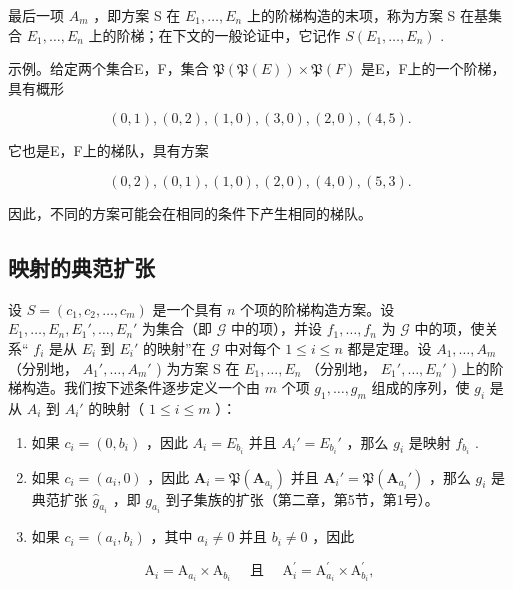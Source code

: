 最后一项 \(A_{m}\) ，即方案 S 在 \(E_{1}, \ldots, E_{n}\) 上的阶梯构造的末项，称为方案 S 在基集合 \(E_{1}, \ldots, E_{n}\) 上的阶梯；在下文的一般论证中，它记作 \(S(E_{1}, \ldots, E_{n})\) .

示例。给定两个集合E，F，集合 \(\mathfrak{P}(\mathfrak{P}(E)) \times \mathfrak{P}(F)\) 是E，F上的一个阶梯，具有概形

\[
(0, 1), (0, 2), (1, 0), (3, 0), (2, 0), (4, 5).
\]

它也是E，F上的梯队，具有方案

\[
(0, 2), (0, 1), (1, 0), (2, 0), (4, 0), (5, 3).
\]

因此，不同的方案可能会在相同的条件下产生相同的梯队。

\subsection{映射的典范扩张}

设 \(S = (c_1, c_2, \ldots, c_m)\) 是一个具有 \(n\) 个项的阶梯构造方案。设 \(E_1, \ldots, E_n, E_1', \ldots, E_n'\) 为集合（即 \(\mathcal{G}\) 中的项），并设 \(f_1, \ldots, f_n\) 为 \(\mathcal{G}\) 中的项，使关系“ \(f_i\) 是从 \(E_i\) 到 \(E_i'\) 的映射”在 \(\mathcal{G}\) 中对每个 \(1 \leqslant i \leqslant n\) 都是定理。设 \(A_1, \ldots, A_m\) （分别地， \(A_1', \ldots, A_m'\) ) 为方案 S 在 \(E_1, \ldots, E_n\) （分别地， \(E_1', \ldots, E_n'\) ) 上的阶梯构造。我们按下述条件逐步定义一个由 \(m\) 个项 \(g_1, \ldots, g_m\) 组成的序列，使 \(g_i\) 是从 \(A_i\) 到 \(A_i'\) 的映射（ \(1 \leqslant i \leqslant m\) ）：

\begin{enumerate}
\def\labelenumi{(\alph{enumi})}
\item
  如果 \(c_{i} = (0, b_{i})\) ，因此 \(A_{i} = E_{b_{i}}\) 并且 \(A_{i}' = E_{b_{i}}'\) ，那么 \(g_{i}\) 是映射 \(f_{b_{i}}\) .
\item
  如果 \(c_{i} = (a_{i}, 0)\) ，因此 \(\mathbf{A}_{i} = \mathfrak{P}(\mathbf{A}_{a_{i}})\) 并且 \(\mathbf{A}_{i}' = \mathfrak{P}(\mathbf{A}_{a_{i}}')\) ，那么 \(g_{i}\) 是典范扩张 \(\hat{g}_{a_i}\) ，即 \(g_{a_i}\) 到子集族的扩张（第二章，第5节，第1号）。
\item
  如果 \(c_{i} = (a_{i}, b_{i})\) ，其中 \(a_{i} \neq 0\) 并且 \(b_{i} \neq 0\) ，因此
\end{enumerate}

\[
\mathrm{A} _ {i} = \mathrm{A} _ {a _ {i}} \times \mathrm{A} _ {b _ {i}} \quad \text { 且 } \quad \mathrm{A} _ {i} ^ {\prime} = \mathrm{A} _ {a _ {i}} ^ {\prime} \times \mathrm{A} _ {b _ {i}} ^ {\prime},
\]

